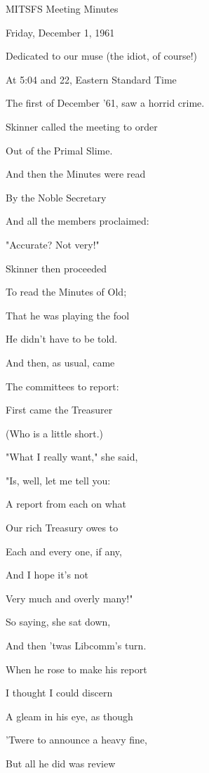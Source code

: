 \documentclass[12pt]{article}
\begin{document}
\begin{center}

MITSFS Meeting Minutes

Friday, December 1, 1961

Dedicated to our muse (the idiot, of course!)

\end{center}
 
\vspace{12pt}

\setlength{\parskip}{6pt}

\noindent
At 5:04 and 22, Eastern Standard Time

The first of December '61, saw a horrid crime.

Skinner called the meeting to order

Out of the Primal Slime.

And then the Minutes were read

By the Noble Secretary

And all the members proclaimed:

"Accurate? Not very!"

Skinner then proceeded

To read the Minutes of Old;

That he was playing the fool

He didn't have to be told.

And then, as usual, came

The committees to report:

First came the Treasurer

(Who is a little short.)

"What I really want," she said,

"Is, well, let me tell you:

A report from each on what

Our rich Treasury owes to

Each and every one, if any,

And I hope it's not

Very much and overly many!"

So saying, she sat down,

And then 'twas Libcomm's turn.

When he rose to make his report

I thought I could discern

A gleam in his eye, as though

'Twere to announce a heavy fine,

But all he did was review
\end{document}
